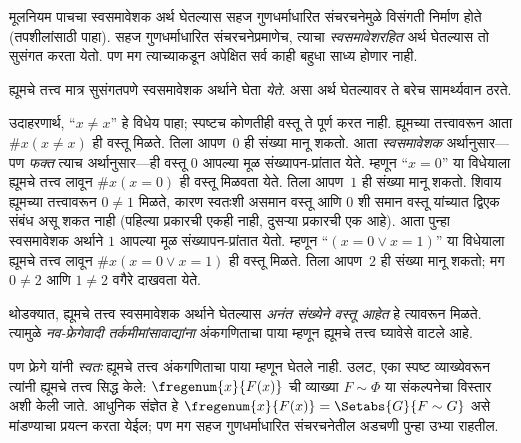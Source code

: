 \documentclass[../../../include/open-logic-section]{subfiles}
\begin{document}
मूलनियम पाचचा स्वसमावेशक अर्थ घेतल्यास सहज गुणधर्माधारित संचरचनेमुळे विसंगती निर्माण होते (तपशीलांसाठी  पाहा). सहज गुणधर्माधारित संचरचनेप्रमाणेच, त्याचा \emph{स्वसमावेशरहित} अर्थ घेतल्यास तो सुसंगत करता येतो. पण मग त्याच्याकडून अपेक्षित सर्व काही बहुधा साध्य होणार नाही.

ह्यूमचे तत्त्व मात्र सुसंगतपणे स्वसमावेशक अर्थाने घेता \emph{येते}. असा अर्थ घेतल्यावर ते बरेच सामर्थ्यवान ठरते.

उदाहरणार्थ, “$x \neq x$” हे विधेय पाहा; स्पष्टच कोणतीही वस्तू ते पूर्ण करत नाही. ह्यूमच्या तत्त्वावरून आता $\# x( x\neq
x)$ ही वस्तू मिळते. तिला आपण~$0$ ही संख्या मानू शकतो. आता \emph{स्वसमावेशक} अर्थानुसार—पण \emph{फक्त} त्याच अर्थानुसार—ही वस्तू $0$ आपल्या मूळ संख्यापन-प्रांतात येते. म्हणून “$x = 0$” या विधेयाला ह्यूमचे तत्त्व लावून $\#x (x =
0)$ ही वस्तू मिळवता येते. तिला आपण~$1$ ही संख्या मानू शकतो. शिवाय ह्यूमच्या तत्त्वावरून $0 \neq 1$ मिळते, कारण स्वतःशी असमान वस्तू आणि $0$ शी समान वस्तू यांच्यात द्विएक संबंध असू शकत नाही (पहिल्या प्रकारची एकही नाही, दुसऱ्या प्रकारची एक आहे). आता पुन्हा स्वसमावेशक अर्थाने $1$ आपल्या मूळ संख्यापन-प्रांतात येतो. म्हणून “$(x = 0 \lor x = 1)$” या विधेयाला ह्यूमचे तत्त्व लावून $\#x(x = 0 \lor
x = 1)$ ही वस्तू मिळते. तिला आपण~$2$ ही संख्या मानू शकतो; मग $0\neq 2$ आणि $1 \neq 2$ वगैरे दाखवता येते.

थोडक्यात, ह्यूमचे तत्त्व स्वसमावेशक अर्थाने घेतल्यास \emph{अनंत संख्येने वस्तू आहेत} हे त्यावरून मिळते. त्यामुळे \emph{नव-फ्रेगेवादी तर्कमीमांसावाद्यांना} अंकगणिताचा पाया म्हणून ह्यूमचे तत्त्व घ्यावेसे वाटले आहे.

पण फ्रेगे यांनी \emph{स्वतः} ह्यूमचे तत्त्व अंकगणिताचा पाया म्हणून घेतले नाही. उलट, एका स्पष्ट व्याख्येवरून त्यांनी ह्यूमचे तत्त्व सिद्ध केले: $\fregenum{x}{F(x)}$ ची व्याख्या $F \sim \Phi$ या संकल्पनेचा विस्तार अशी केली जाते. आधुनिक संज्ञेत हे $\fregenum{x}{F(x)} = \Setabs{G}{F \sim G}$ असे मांडण्याचा प्रयत्न करता येईल; पण मग सहज गुणधर्माधारित संचरचनेतील अडचणी पुन्हा उभ्या राहतील.
\end{document}

